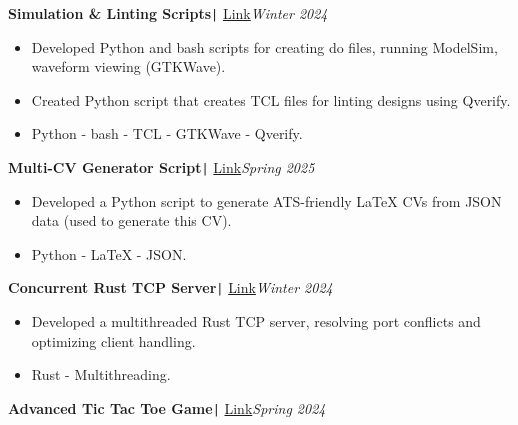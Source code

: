 \documentclass[11pt,a4paper]{article}
\begin{document}
\vspace{-0.5cm}
\begin{flushleft}
\textbf{Simulation \& Linting Scripts}\texttt{|} {\href{https://github.com/salah0eldin/Scripts}{Link}}\hfill\textit{Winter 2024}\\
\end{flushleft}
\vspace{-0.7cm}
\begin{itemize}
\item \setlength{\itemsep}{-0.0em} Developed Python and bash scripts for creating do files, running ModelSim, waveform viewing (GTKWave).
\item \setlength{\itemsep}{-0.0em} Created Python script that creates TCL files for linting designs using Qverify.
\item \setlength{\itemsep}{-0.0em} Python - bash - TCL - GTKWave - Qverify.
\end{itemize}
\vspace{-0.5cm}
\begin{flushleft}
\textbf{Multi-CV Generator Script}\texttt{|} {\href{https://github.com/salah0eldin/CV}{Link}}\hfill\textit{Spring 2025}\\
\end{flushleft}
\vspace{-0.7cm}
\begin{itemize}
\item \setlength{\itemsep}{-0.0em} Developed a Python script to generate ATS-friendly LaTeX CVs from JSON data (used to generate this CV).
\item \setlength{\itemsep}{-0.0em} Python - LaTeX - JSON.
\end{itemize}
\vspace{-0.5cm}
\begin{flushleft}
\textbf{Concurrent Rust TCP Server}\texttt{|} {\href{https://github.com/salah0eldin/RustTCPServer}{Link}}\hfill\textit{Winter 2024}\\
\end{flushleft}
\vspace{-0.7cm}
\begin{itemize}
\item \setlength{\itemsep}{-0.0em} Developed a multithreaded Rust TCP server, resolving port conflicts and optimizing client handling.
\item \setlength{\itemsep}{-0.0em} Rust - Multithreading.
\end{itemize}
\vspace{-0.5cm}
\begin{flushleft}
\textbf{Advanced Tic Tac Toe Game}\texttt{|} {\href{https://www.linkedin.com/posts/salah-eldin-hassen-5bba10250_qt-cplusplus-softwaredevelopment-activity-7227345922031009793-xhzd/?rcm=ACoAAD4WDF8Bk9P5oS-irdrlv53Rzjd03ps4OSA}{Link}}\hfill\textit{Spring 2024}\\
\end{flushleft}
\end{document}
